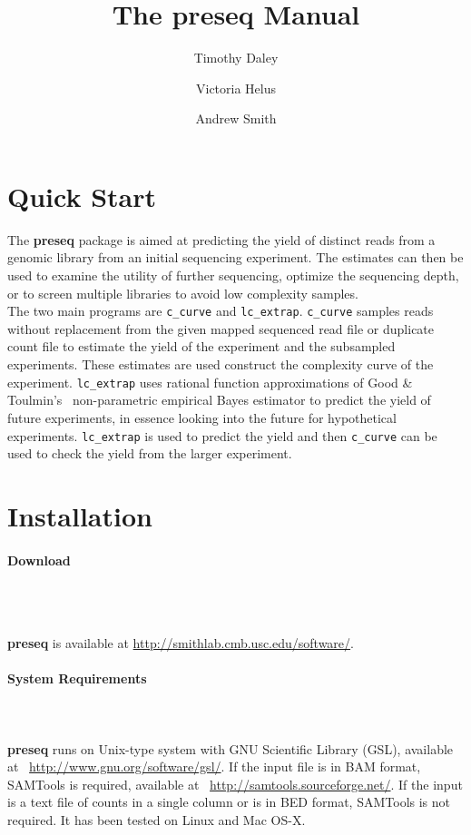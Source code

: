 \documentclass[11pt, titlepage]{article}
\title{The preseq Manual}
\author{Timothy Daley \and Victoria Helus \and Andrew Smith }
\begin{document}
\maketitle

\tableofcontents

\newpage

\section{Quick Start}
\label{chap:quickstart}
\newcommand{\fn}[1]{\texttt{#1}}



The \textbf{preseq} package is aimed at predicting
the yield of distinct reads from a genomic library
from an initial sequencing experiment.  The estimates
can then be used to examine the utility of further
sequencing, optimize the sequencing depth,
or to screen multiple libraries to avoid low complexity
samples.~\\[-.2cm]

\noindent The two main programs are \fn{c\_curve} and \fn{lc\_extrap}.
\fn{c\_curve} samples reads without replacement from the 
given mapped sequenced read file or duplicate count file to estimate the yield
of the experiment and the subsampled experiments.  These estimates
are used construct the complexity
curve of the experiment.  \fn{lc\_extrap} uses rational function approximations
of Good \& Toulmin's~\cite{good1956number} non-parametric
empirical Bayes estimator to predict the yield
of future experiments, in essence looking into the future
for hypothetical experiments.  \fn{lc\_extrap} is used to predict 
the yield and then \fn{c\_curve} can be used to check the yield
from the larger experiment.

\newpage

\section{Installation}
\label{sec:install}

\paragraph{Download}
\label{sub:download}~\\~\\[-.2cm]
\raggedright{\textbf{preseq} is available at }
\url{http://smithlab.cmb.usc.edu/software/}.


\paragraph{System Requirements}
\label{sub:require}
~\\~\\[-.2cm]
\textbf{preseq} runs on Unix-type system
with GNU Scientific Library (GSL), available
at ~\url{http://www.gnu.org/software/gsl/}.  
If the input file is in BAM format, SAMTools is
required, available at ~\url{http://samtools.sourceforge.net/}.
If the input is 
a text file of counts in a single column or is 
in BED format, 
SAMTools is not required.
It has been tested on Linux and 
Mac OS-X.  
\end{document}
